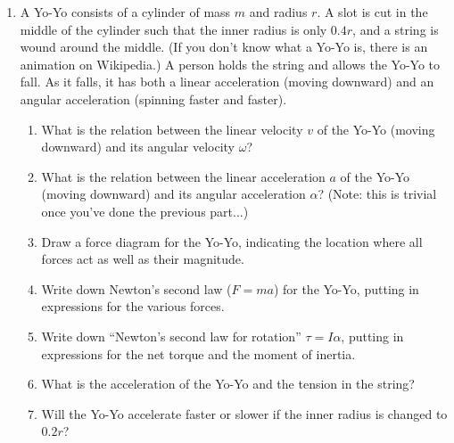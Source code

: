 \documentclass[12pt]{article}
\begin{document}
\begin{enumerate}
   \item{A Yo-Yo consists of a cylinder of mass $m$ and radius $r$. A slot is cut in the middle of the cylinder such that the inner radius is only $0.4r$, and a string is wound around the middle. (If you don't know what a Yo-Yo is, there is an animation on Wikipedia.)
     A person holds the string and allows the Yo-Yo to fall. As it falls, it has both a linear acceleration (moving downward) and an angular acceleration (spinning faster and faster).}
     \begin{enumerate}
       \item{What is the relation between the linear velocity $v$ of the Yo-Yo (moving downward) and its angular velocity $\omega$?}

\vspace{1in}
       \item{What is the relation between the linear acceleration $a$ of the Yo-Yo (moving downward) and its angular acceleration $\alpha$? (Note: this is trivial once you've done the previous part...)}

\vspace{1in}

       \item{Draw a force diagram for the Yo-Yo, indicating the location where all forces act as well as their magnitude.}

\vspace{3in}

       \item{Write down Newton's second law ($F=ma$) for the Yo-Yo, putting in expressions for the various forces.}

\vspace{2in}

       \item{Write down ``Newton's second law for rotation'' $\tau = I \alpha$, putting in expressions for the net torque and the moment of inertia.}

\vspace{2in}
       \item{What is the acceleration of the Yo-Yo and the tension in the string?}

\vspace{3in}
       \item{Will the Yo-Yo accelerate faster or slower if the inner radius is changed to $0.2r$?}


     \end{enumerate}

\newpage
\centerline{}



\end{enumerate}
\end{document}

